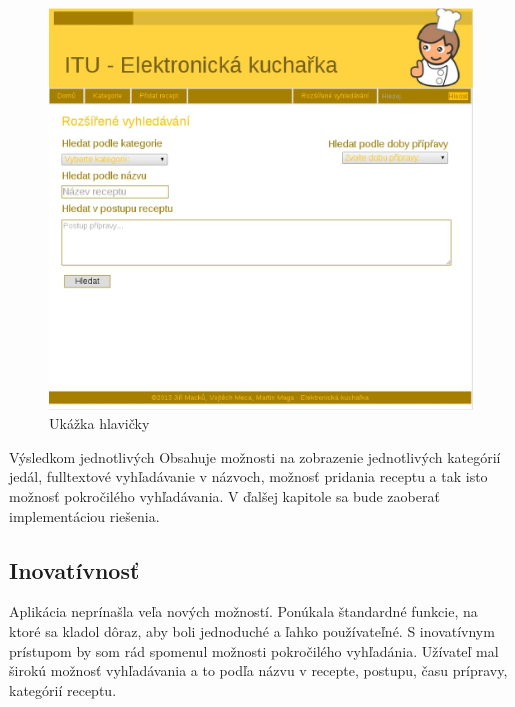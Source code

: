 \documentclass[12pt,a4paper,titlepage,final]{article}
\begin{document}
\begin{figure}
\begin{center}

\includegraphics[scale=0.7]{img/extendedsearch.eps} 
\caption{Ukážka hlavičky}


\end{center}

\end{figure}


Výsledkom jednotlivých Obsahuje možnosti na zobrazenie jednotlivých kategórií jedál, fulltextové vyhľadávanie v názvoch, možnosť pridania receptu  a tak isto možnosť pokročilého vyhľadávania. V ďalšej kapitole sa bude zaoberať implementáciou riešenia. 

\subsection{Inovatívnosť}
Aplikácia neprínašla veľa nových možností. Ponúkala štandardné funkcie, na ktoré sa kladol dôraz, aby boli jednoduché a ľahko používateľné. S inovatívnym prístupom by som rád spomenul možnosti pokročilého vyhľadánia. Užívateľ mal širokú možnosť vyhľadávania a to podľa názvu v recepte, postupu, času prípravy, kategórií receptu.
\end{document}
